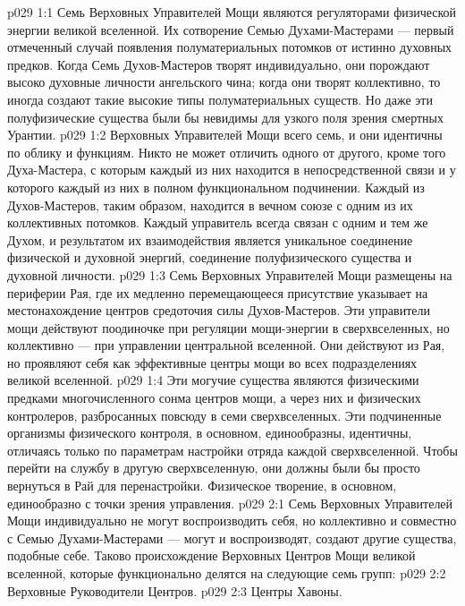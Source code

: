 \vs p029 1:1 Семь Верховных Управителей Мощи являются регуляторами физической энергии великой вселенной. Их сотворение Семью Духами\hyp{}Мастерами --- первый отмеченный случай появления полуматериальных потомков от истинно духовных предков. Когда Семь Духов\hyp{}Мастеров творят индивидуально, они порождают высоко духовные личности ангельского чина; когда они творят коллективно, то иногда создают такие высокие типы полуматериальных существ. Но даже эти полуфизические существа были бы невидимы для узкого поля зрения смертных Урантии.
\vs p029 1:2 Верховных Управителей Мощи всего семь, и они идентичны по облику и функциям. Никто не может отличить одного от другого, кроме того Духа\hyp{}Мастера, с которым каждый из них находится в непосредственной связи и у которого каждый из них в полном функциональном подчинении. Каждый из Духов\hyp{}Мастеров, таким образом, находится в вечном союзе с одним из их коллективных потомков. Каждый управитель всегда связан с одним и тем же Духом, и результатом их взаимодействия является уникальное соединение физической и духовной энергий, соединение полуфизического существа и духовной личности.
\vs p029 1:3 Семь Верховных Управителей Мощи размещены на периферии Рая, где их медленно перемещающееся присутствие указывает на местонахождение центров средоточия силы Духов\hyp{}Мастеров. Эти управители мощи действуют поодиночке при регуляции мощи\hyp{}энергии в сверхвселенных, но коллективно --- при управлении центральной вселенной. Они действуют из Рая, но проявляют себя как эффективные центры мощи во всех подразделениях великой вселенной.
\vs p029 1:4 Эти могучие существа являются физическими предками многочисленного сонма центров мощи, а через них и физических контролеров, разбросанных повсюду в семи сверхвселенных. Эти подчиненные организмы физического контроля, в основном, единообразны, идентичны, отличаясь только по параметрам настройки отряда каждой сверхвселенной. Чтобы перейти на службу в другую сверхвселенную, они должны были бы просто вернуться в Рай для перенастройки. Физическое творение, в основном, единообразно с точки зрения управления.
\vs p029 2:1 Семь Верховных Управителей Мощи индивидуально не могут воспроизводить себя, но коллективно и совместно с Семью Духами\hyp{}Мастерами --- могут и воспроизводят, создают другие существа, подобные себе. Таково происхождение Верховных Центров Мощи великой вселенной, которые функционально делятся на следующие семь групп:
\vs p029 2:2 \bibnobreakspace Верховные Руководители Центров.
\vs p029 2:3 \bibnobreakspace Центры Хавоны.
